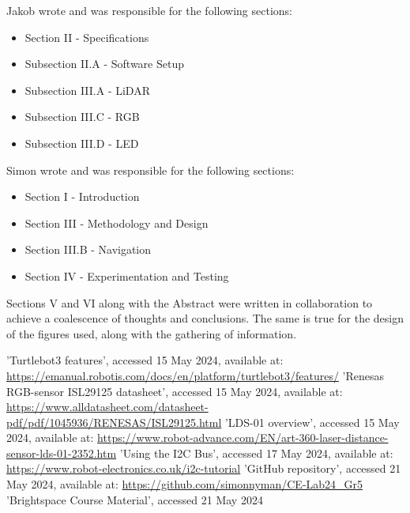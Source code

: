 \documentclass[conference]{IEEEtran}
\begin{document}
Jakob wrote and was responsible for the following sections:
\begin{itemize}
    \item Section II - Specifications
    \item Subsection II.A - Software Setup
    \item Subsection III.A - LiDAR
    \item Subsection III.C - RGB
    \item Subsection III.D - LED
\end{itemize}

Simon wrote and was responsible for the following sections:
\begin{itemize}
    \item Section I - Introduction
    \item Section III - Methodology and Design
    \item Section III.B - Navigation
    \item Section IV - Experimentation and Testing
\end{itemize}

Sections V and VI along with the Abstract were written in collaboration to achieve a coalescence of thoughts and conclusions.
The same is true for the design of the figures used, along with the gathering of information.
\begin{thebibliography}{00}
 'Turtlebot3 features', accessed 15 May 2024, available at: \url{https://emanual.robotis.com/docs/en/platform/turtlebot3/features/}
 'Renesas RGB-sensor ISL29125 datasheet', accessed 15 May 2024, available at: \url{https://www.alldatasheet.com/datasheet-pdf/pdf/1045936/RENESAS/ISL29125.html}
 'LDS-01 overview', accessed 15 May 2024, available at: \url{https://www.robot-advance.com/EN/art-360-laser-distance-sensor-lds-01-2352.htm}
 'Using the I2C Bus', accessed 17 May 2024, available at: \url{https://www.robot-electronics.co.uk/i2c-tutorial}
 'GitHub repository', accessed 21 May 2024, available at: \url{https://github.com/simonnyman/CE-Lab24_Gr5}
 'Brightspace Course Material', accessed 21 May 2024
\end{thebibliography}
\end{document}
